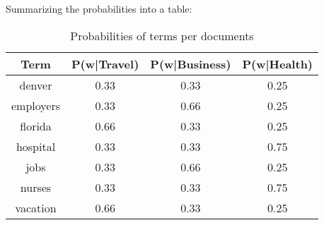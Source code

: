 \documentclass[11pt]{article}
\begin{document}
\begin{enumerate}
        Summarizing the probabilities into a table: 

        \begin{table}[!ht]
            \caption{Probabilities of terms per documents}
            \begin{center}
                \begin{tabular}[t]{|c|c|c|c|}
                    \hline
                    \textbf{Term} & \textbf{P(w|Travel)} & \textbf{P(w|Business)} & \textbf{P(w|Health)}
                    \\ \hline
                    denver      & 0.33 & 0.33 & 0.25
                    \\ \hline
                    employers   & 0.33 & 0.66 & 0.25
                    \\ \hline
                    florida     & 0.66 & 0.33 & 0.25
                    \\ \hline
                    hospital    & 0.33 & 0.33 & 0.75
                    \\ \hline
                    jobs        & 0.33 & 0.66 & 0.25
                    \\ \hline
                    nurses      & 0.33 & 0.33 & 0.75
                    \\ \hline
                    vacation    & 0.66 & 0.33 & 0.25
                    \\ \hline
                \end{tabular}
            \end{center}
        \end{table}
        \newpage


\end{enumerate}
\end{document}
